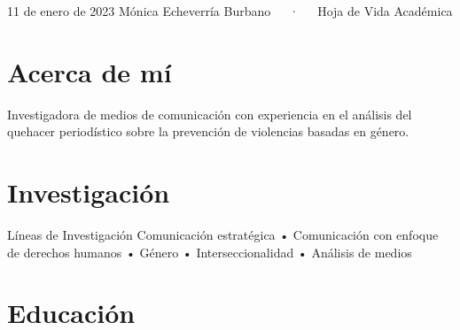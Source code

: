 \documentclass[11pt,a4paper,]{awesome-cv}
\begin{document}
\makecvheader

\makecvfooter
  {11 de enero de 2023}
    {Mónica Echeverría Burbano~~~·~~~Hoja de Vida Académica}
  {\thepage}





\hypertarget{acerca-de-muxed}{%
\section{Acerca de mí}\label{acerca-de-muxed}}

Investigadora de medios de comunicación con experiencia en el análisis
del quehacer periodístico sobre la prevención de violencias basadas en
género.

\hypertarget{investigaciuxf3n}{%
\section{Investigación}\label{investigaciuxf3n}}

\begin{cvskills}
  \cvskill
    {Líneas de Investigación}
    {Comunicación estratégica • Comunicación con enfoque de derechos humanos • Género • Interseccionalidad • \newline
    Análisis de medios}
\end{cvskills}

\hypertarget{educaciuxf3n}{%
\section{Educación}\label{educaciuxf3n}}

\begin{cventries}
    \vspace{-4.0mm}
    \vspace{-4.0mm}
    \vspace{-4.0mm}
    \vspace{-4.0mm}
    \vspace{-4.0mm}
\end{cventries}
\end{document}

